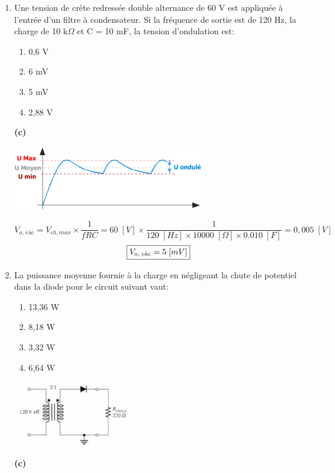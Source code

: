 \documentclass[a4paper]{article}
\begin{document}
\begin{enumerate}
\item Une tension de crête redressée double alternance de 60 V est appliquée à l’entrée d’un filtre à condensateur. Si la fréquence de sortie est de 120 Hz, la charge de 10 k$\Omega$ et C = 10 mF, la tension d’ondulation est:
\begin{enumerate}
    \item 0,6 V
    \item 6 mV
    \item 5 mV
    \item 2,88 V
\end{enumerate}
\begin{example}
    \textbf{(c)}
    \begin{center}
        \includegraphics[width=0.65\textwidth]{images/filtrage-condensateur.PNG}
    \end{center}
    \[
        V_{\text{o, càc}} = V_{ch, max} \times \frac{1}{f R C}
        = 60 \; [V] \times \frac{1}{120 \; [Hz] \times 10000 \; [\Omega] \times 0.010 \; [F]}
        = 0,005 \; [V]
    \]
    \[ \fbox{$ V_{\text{o, càc}} = 5 \; [mV] $} \]
\end{example}





\item La puissance moyenne fournie à la charge en négligeant la chute de potentiel dans la diode pour le circuit suivant vaut:
\begin{enumerate}
    \item 13,36 W
    \item 8,18 W
    \item 3,32 W
    \item 6,64 W
\end{enumerate}
\begin{center}
    \includegraphics[width=0.4\textwidth]{images/interro1-ex7-1.PNG}
\end{center}
\begin{example}
    \textbf{(c)}


\end{example}
\end{enumerate}
\end{document}
